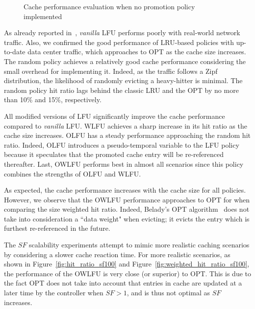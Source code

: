 \begin{figure}[!t]
{		\label{fig:weighted_hit_ratio_sf10}
	}
	\caption{Cache performance evaluation when no promotion policy implemented}
	\label{fig:hit_ratio}
\end{figure}

As already reported in~\cite{Kim:09}, \textit{vanilla} LFU performs poorly with real-world network traffic.
Also, we confirmed the good performance of LRU-based policies with up-to-date data center traffic, which approaches to OPT as the cache size increases.
The random policy achieves a relatively good cache performance considering the small overhead for implementing it.
Indeed, as the traffic follows a Zipf distribution, the likelihood of randomly evicting a heavy-hitter is minimal.
The random policy hit ratio lags behind the classic LRU and the OPT by no more than 10\% and 15\%, respectively.

All modified versions of LFU significantly improve the cache performance compared to \textit{vanilla} LFU.
WLFU achieves a sharp increase in its hit ratio as the cache size increases.
OLFU has a steady performance approaching the random hit ratio.
Indeed, OLFU introduces a pseudo-temporal variable to the LFU policy because it speculates that the promoted cache entry will be re-referenced thereafter. 
Last, OWLFU performs best in almost all scenarios since this policy combines the strengths of OLFU and WLFU.

As expected, the cache performance increases with the cache size for all policies.
However, we observe that the OWLFU performance approaches to OPT for when comparing the size weighted hit ratio.
Indeed, Belady's OPT algorithm~\cite{Belady:66} does not take into consideration a ``data weight" when evicting; it evicts the entry which is furthest re-referenced in the future.

The $SF$ scalability experiments attempt to mimic more realistic caching scenarios by considering a slower cache reaction time.
For more realistic scenarios, as shown in Figure~\ref{fig:hit_ratio_sf100} and Figure~\ref{fig:weighted_hit_ratio_sf100}, the performance of the OWLFU is very close (or superior) to OPT.
This is due to the fact OPT does not take into account that entries in cache are updated at a later time by the controller when $SF>1$, and is thus not optimal as $SF$ increases.

